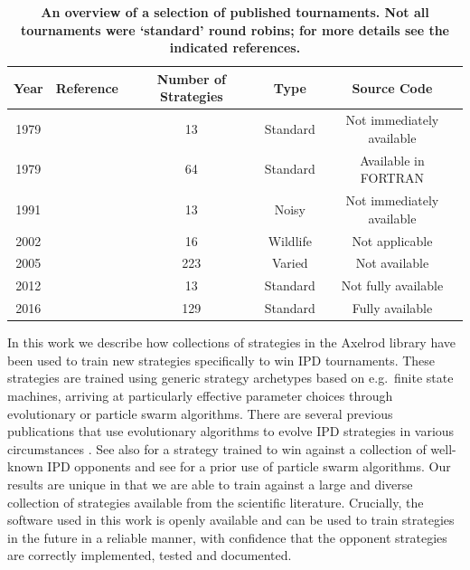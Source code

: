\documentclass[10pt,letterpaper]{article}
\begin{document}
\begin{table}[!hbtp]
    \caption{\bf An overview of a selection of published tournaments. Not all
             tournaments were `standard' round robins; for more details
             see the indicated references.}\label{tbl:tournaments}
    \begin{center}
        \begin{tabular}{ccccc}
            \toprule
            Year     & Reference                  & Number of Strategies & Type     & Source Code\\
            \midrule
            1979     & \cite{Axelrod1980a}        & 13                   & Standard & Not immediately available\\
            1979     & \cite{Axelrod1980b}        & 64                   & Standard & Available in FORTRAN\\
            1991     & \cite{Bendor1991}          & 13                   & Noisy    & Not immediately available\\
            2002     & \cite{Stephens2002}        & 16                   & Wildlife & Not applicable\\
            2005     & \cite{kendall2007iterated} & 223                  & Varied   & Not available \\
            2012     & \cite{Stewart2012}         & 13                   & Standard & Not fully available \\
            2016     & \cite{knight2016open}       & 129                  & Standard & Fully available \\
            \bottomrule
        \end{tabular}
    \end{center}
\end{table}

In this work we describe how collections of strategies in the Axelrod library
have been used to train new strategies specifically to win IPD tournaments.
These strategies are trained using generic strategy archetypes based on e.g.\
finite state
machines, arriving at particularly effective parameter choices through
evolutionary or particle swarm algorithms. There are several
previous publications that use evolutionary algorithms to
evolve IPD strategies in various circumstances
\cite{ashlock2006training, Ashlock2015,  Ashlock2006,
      ashlock2014shaped, Ashlock2014, barlow2015varying,
      fogel1993evolving, marks1989niche, sudo2015effects,
      vassiliades2010multiagent}. See also \cite{Gaudesi2016} for a
strategy trained to win against a collection of well-known IPD opponents and see
\cite{franken2005particle} for a prior use of particle swarm algorithms. Our
results are unique in that we are able to train against a large and diverse
collection of strategies available from the scientific literature.
Crucially, the
software used in this work is openly available and can be used to train strategies
in the future in a reliable manner, with confidence that the opponent strategies
are correctly implemented, tested and documented.
\end{document}
